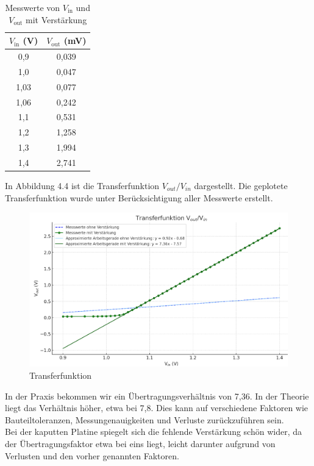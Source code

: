 \begin{table}[h]
\centering
\begin{tabular}{|c|c|}
\hline
$V_{\text{in}}$ (V) & $V_{\text{out}}$ (mV) \\
\hline
0{,}9 & 0{,}039 \\
1{,}0 & 0{,}047\\
1{,}03 & 0{,}077 \\
1{,}06 & 0{,}242 \\
1{,}1 & 0{,}531 \\
1{,}2 & 1{,}258 \\
1{,}3 & 1{,}994 \\
1{,}4 & 2{,}741 \\
\hline
\end{tabular}
\caption{Messwerte von $V_{\text{in}}$ und $V_{\text{out}}$ mit Verstärkung}
\end{table}
\clearpage
In Abbildung 4.4 ist die Transferfunktion $V_{out}/V_{in}$ dargestellt. Die geplotete Transferfunktion wurde
unter Berücksichtigung aller Messwerte erstellt.\\

\begin{figure}[H]
    \centering
    \includegraphics[width=1\textwidth]{Pictures/Transferfunktion.jpf.png}
    \caption{Transferfunktion}
    \label{fig:opamp_schaltung}
\end{figure}
In der Praxis bekommen wir ein Übertragungsverhältnis von 7,36.
In der Theorie liegt das Verhältnis höher, etwa bei 7,8. 
Dies kann auf verschiedene Faktoren wie Bauteiltoleranzen, Messungenauigkeiten und Verluste zurückzuführen sein.
\\
Bei der kaputten Platine spiegelt sich die fehlende Verstärkung schön wider, da der Übertragungsfaktor etwa bei eins liegt,
leicht darunter aufgrund von Verlusten und den vorher genannten Faktoren.

